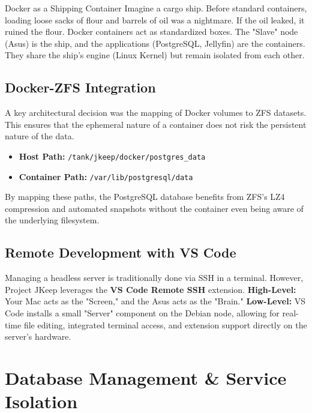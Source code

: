 \documentclass[12pt,a4paper,oneside]{book}
\begin{document}
\begin{conceptbox}{Docker as a Shipping Container}
Imagine a cargo ship. Before standard containers, loading loose sacks of flour and barrels of oil was a nightmare. If the oil leaked, it ruined the flour. Docker containers act as standardized boxes. The "Slave" node (Asus) is the ship, and the applications (PostgreSQL, Jellyfin) are the containers. They share the ship's engine (Linux Kernel) but remain isolated from each other.
\end{conceptbox}

\section{Docker-ZFS Integration}
A key architectural decision was the mapping of Docker volumes to ZFS datasets. This ensures that the ephemeral nature of a container does not risk the persistent nature of the data.
\begin{itemize}
    \item \textbf{Host Path:} \texttt{/tank/jkeep/docker/postgres\_data}
    \item \textbf{Container Path:} \texttt{/var/lib/postgresql/data}
\end{itemize}
By mapping these paths, the PostgreSQL database benefits from ZFS's LZ4 compression and automated snapshots without the container even being aware of the underlying filesystem.

\section{Remote Development with VS Code}
Managing a headless server is traditionally done via SSH in a terminal. However, Project JKeep leverages the \textbf{VS Code Remote SSH} extension. 
\textbf{High-Level:} Your Mac acts as the "Screen," and the Asus acts as the "Brain."
\textbf{Low-Level:} VS Code installs a small "Server" component on the Debian node, allowing for real-time file editing, integrated terminal access, and extension support directly on the server's hardware.

\chapter{Database Management \& Service Isolation}
\end{document}
